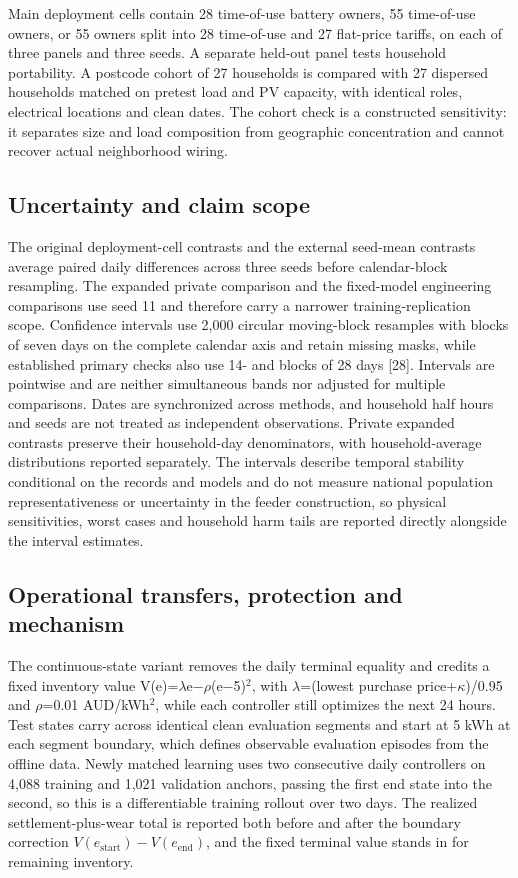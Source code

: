 \documentclass[pdflatex,Numbered,sn-basic]{sn-jnl}
\begin{document}
Main deployment cells contain 28 time-of-use battery owners, 55 time-of-use owners, or 55 owners split into 28 time-of-use and 27 flat-price tariffs, on each of three panels and three seeds. A separate held-out panel tests household portability. A postcode cohort of 27 households is compared with 27 dispersed households matched on pretest load and PV capacity, with identical roles, electrical locations and clean dates. The cohort check is a constructed sensitivity: it separates size and load composition from geographic concentration and cannot recover actual neighborhood wiring.

\subsection{Uncertainty and claim scope}

The original deployment-cell contrasts and the external seed-mean contrasts average paired daily differences across three seeds before calendar-block resampling. The expanded private comparison and the fixed-model engineering comparisons use seed 11 and therefore carry a narrower training-replication scope. Confidence intervals use 2,000 circular moving-block resamples with blocks of seven days on the complete calendar axis and retain missing masks, while established primary checks also use 14- and blocks of 28 days [28]. Intervals are pointwise and are neither simultaneous bands nor adjusted for multiple comparisons. Dates are synchronized across methods, and household half hours and seeds are not treated as independent observations. Private expanded contrasts preserve their household-day denominators, with household-average distributions reported separately. The intervals describe temporal stability conditional on the records and models and do not measure national population representativeness or uncertainty in the feeder construction, so physical sensitivities, worst cases and household harm tails are reported directly alongside the interval estimates.

\subsection{Operational transfers, protection and mechanism}

The continuous-state variant removes the daily terminal equality and credits a fixed inventory value V(e)=$\lambda$e$-$$\rho$(e$-$5)$^{2}$, with $\lambda$=(lowest purchase price+$\kappa$)/0.95 and $\rho$=0.01 AUD/kWh$^{2}$, while each controller still optimizes the next 24 hours. Test states carry across identical clean evaluation segments and start at 5 kWh at each segment boundary, which defines observable evaluation episodes from the offline data. Newly matched learning uses two consecutive daily controllers on 4,088 training and 1,021 validation anchors, passing the first end state into the second, so this is a differentiable training rollout over two days. The realized settlement-plus-wear total is reported both before and after the boundary correction $V(e_{\mathrm{start}})-V(e_{\mathrm{end}})$, and the fixed terminal value stands in for remaining inventory.
\end{document}
